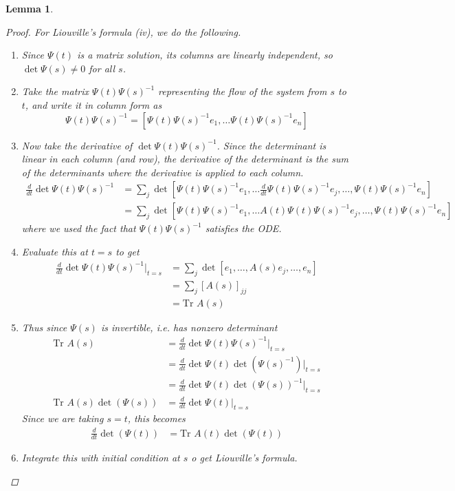 \documentclass{article}
\newtheorem{lemma}[theorem]{Lemma}
\begin{document}
\begin{lemma}
\begin{proof}
For Liouville's formula (iv), we do the following.
\begin{enumerate}
\item Since $\Psi(t)$ is a matrix solution, its columns are linearly independent, so $\det \Psi(s) \neq 0$ for all $s$.
\item Take the matrix $\Psi(t)\Psi(s)^{-1}$ representing the flow of the system from $s$ to $t$, and write it in column form as
\[
\Psi(t)\Psi(s)^{-1} = \left[\Psi(t)\Psi(s)^{-1} e_1, \dots \Psi(t)\Psi(s)^{-1}e_n\right]
\]
\item Now take the derivative of $\det \Psi(t)\Psi(s)^{-1}$. Since the determinant is linear in each column (and row), the derivative of the determinant is the sum of the determinants where the derivative is applied to each column.
\begin{align*}
\frac{d}{dt} \det \Psi(t)\Psi(s)^{-1} &= \sum_j \det \left[\Psi(t)\Psi(s)^{-1} e_1, \dots \frac{d}{dt}\Psi(t)\Psi(s)^{-1}e_j, \dots, \Psi(t)\Psi(s)^{-1}e_n\right] \\
&= \sum_j \det \left[\Psi(t)\Psi(s)^{-1} e_1, \dots A(t) \Psi(t)\Psi(s)^{-1}e_j, \dots, \Psi(t)\Psi(s)^{-1}e_n\right]
\end{align*}
where we used the fact that $\Psi(t)\Psi(s)^{-1}$ satisfies the ODE.
\item Evaluate this at $t = s$ to get
\begin{align*}
\frac{d}{dt} \det \Psi(t)\Psi(s)^{-1}\Big|_{t = s} &= \sum_j \det \left[e_1, \dots, A(s) e_j, \dots, e_n\right] \\
&= \sum_j [A(s)]_{jj} \\
&= \text{Tr }A(s)
\end{align*}
\item Thus since $\Psi(s)$ is invertible, i.e. has nonzero determinant
\begin{align*}
\text{Tr }A(s) &= \frac{d}{dt} \det \Psi(t)\Psi(s)^{-1}\Big|_{t = s} \\
&= \frac{d}{dt} \det \Psi(t) \det(\Psi(s)^{-1}) \Big|_{t = s} \\ 
&= \frac{d}{dt} \det \Psi(t) \det(\Psi(s))^{-1} \Big|_{t = s} \\
\text{Tr }A(s) \det(\Psi(s)) &= \frac{d}{dt} \det \Psi(t)\Big|_{t = s}
\end{align*}
Since we are taking $s = t$, this becomes
\begin{align*}
\frac{d}{dt} \det(\Psi(t)) &= \text{Tr }A(t) \det(\Psi(t))
\end{align*}
\item Integrate this with initial condition at $s$ o get Liouville's formula.
\end{enumerate} 
\end{proof}
\end{lemma}
\end{document}
